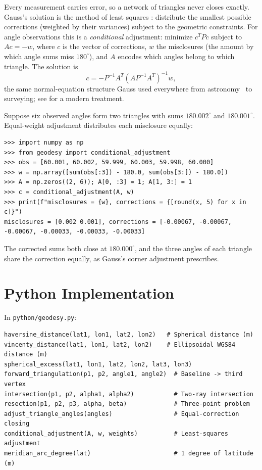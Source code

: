 Every measurement carries error, so a network of triangles never closes exactly. Gauss's solution is the method of least squares : distribute the smallest possible corrections (weighted by their variances) subject to the geometric constraints. For angle observations this is a \emph{conditional} adjustment: minimize $c^T P c$ subject to $A c = -w$, where $c$ is the vector of corrections, $w$ the misclosures (the amount by which angle sums miss $180^\circ$), and $A$ encodes which angles belong to which triangle. The solution is
\[
c = -P^{-1} A^T (A P^{-1} A^T)^{-1} w,
\]
the same normal-equation structure Gauss used everywhere from astronomy~\cite{gauss-theoria} to surveying; see \cite{bjorck} for a modern treatment.

\begin{example}
Suppose six observed angles form two triangles with sums $180.002^\circ$ and $180.001^\circ$. Equal-weight adjustment distributes each misclosure equally:
\begin{lstlisting}[style=python]
>>> import numpy as np
>>> from geodesy import conditional_adjustment
>>> obs = [60.001, 60.002, 59.999, 60.003, 59.998, 60.000]
>>> w = np.array([sum(obs[:3]) - 180.0, sum(obs[3:]) - 180.0])
>>> A = np.zeros((2, 6)); A[0, :3] = 1; A[1, 3:] = 1
>>> c = conditional_adjustment(A, w)
>>> print(f"misclosures = {w}, corrections = {[round(x, 5) for x in c]}")
misclosures = [0.002 0.001], corrections = [-0.00067, -0.00067, -0.00067, -0.00033, -0.00033, -0.00033]
\end{lstlisting}
The corrected sums both close at $180.000^\circ$, and the three angles of each triangle share the correction equally, as Gauss's corner adjustment prescribes.
\end{example}

\section{Python Implementation}

In \texttt{python/geodesy.py}:

\begin{lstlisting}[style=python, caption={Key functions in python/geodesy.py}]
haversine_distance(lat1, lon1, lat2, lon2)   # Spherical distance (m)
vincenty_distance(lat1, lon1, lat2, lon2)    # Ellipsoidal WGS84 distance (m)
spherical_excess(lat1, lon1, lat2, lon2, lat3, lon3)
forward_triangulation(p1, p2, angle1, angle2)  # Baseline -> third vertex
intersection(p1, p2, alpha1, alpha2)           # Two-ray intersection
resection(p1, p2, p3, alpha, beta)             # Three-point problem
adjust_triangle_angles(angles)                 # Equal-correction closing
conditional_adjustment(A, w, weights)          # Least-squares adjustment
meridian_arc_degree(lat)                       # 1 degree of latitude (m)
\end{lstlisting}

